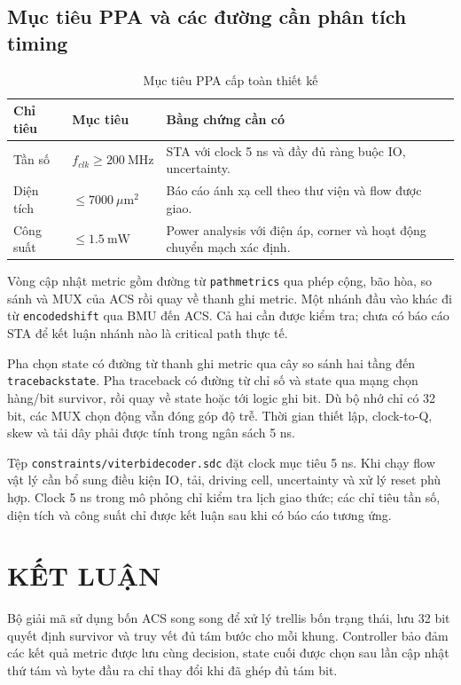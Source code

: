 \documentclass[12pt,a4paper]{article}
\DeclareRobustCommand{\code}[1]{\texttt{#1}}
\renewcommand{\_}{\originalunderscore\allowbreak}
\begin{document}
\subsection{Mục tiêu PPA và các đường cần phân tích timing}
\begin{table}[H]\centering\small
\begin{tabularx}{\textwidth}{@{}P{3.2cm}P{3.5cm}Y@{}}\toprule
\textbf{Chỉ tiêu}&\textbf{Mục tiêu}&\textbf{Bằng chứng cần có}\\\midrule
Tần số&$f_{clk}\ge200\ \mathrm{MHz}$&STA với clock 5 ns và đầy đủ ràng buộc IO, uncertainty.\\
Diện tích&$\le7000\ \mu\mathrm{m}^2$&Báo cáo ánh xạ cell theo thư viện và flow được giao.\\
Công suất&$\le1.5\ \mathrm{mW}$&Power analysis với điện áp, corner và hoạt động chuyển mạch xác định.\\
\bottomrule\end{tabularx}
\caption{Mục tiêu PPA cấp toàn thiết kế}\label{tab:ppa}
\end{table}
Vòng cập nhật metric gồm đường từ \code{path\_metrics} qua phép cộng, bão hòa, so sánh và MUX của ACS rồi quay về thanh ghi metric. Một nhánh đầu vào khác đi từ \code{encoded\_shift} qua BMU đến ACS. Cả hai cần được kiểm tra; chưa có báo cáo STA để kết luận nhánh nào là critical path thực tế.

Pha chọn state có đường từ thanh ghi metric qua cây so sánh hai tầng đến \code{traceback\_state}. Pha traceback có đường từ chỉ số và state qua mạng chọn hàng/bit survivor, rồi quay về state hoặc tới logic ghi bit. Dù bộ nhớ chỉ có 32 bit, các MUX chọn động vẫn đóng góp độ trễ. Thời gian thiết lập, clock-to-Q, skew và tải dây phải được tính trong ngân sách 5 ns.

Tệp \code{constraints/viterbi\_decoder.sdc} đặt clock mục tiêu 5 ns. Khi chạy flow vật lý cần bổ sung điều kiện IO, tải, driving cell, uncertainty và xử lý reset phù hợp. Clock 5 ns trong mô phỏng chỉ kiểm tra lịch giao thức; các chỉ tiêu tần số, diện tích và công suất chỉ được kết luận sau khi có báo cáo tương ứng.

\clearpage
\section{KẾT LUẬN}
Bộ giải mã sử dụng bốn ACS song song để xử lý trellis bốn trạng thái, lưu 32 bit quyết định survivor và truy vết đủ tám bước cho mỗi khung. Controller bảo đảm các kết quả metric được lưu cùng decision, state cuối được chọn sau lần cập nhật thứ tám và byte đầu ra chỉ thay đổi khi đã ghép đủ tám bit.
\end{document}
